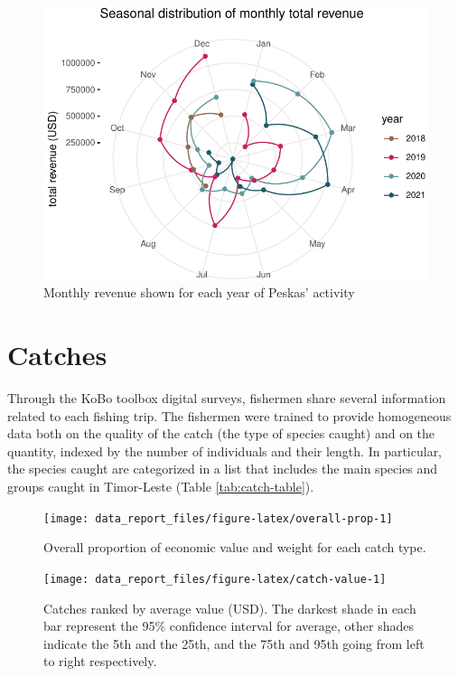 \documentclass[
]{article}
\begin{document}
\begin{figure}
\includegraphics[width=0.9\linewidth,height=0.7\textheight]{data_report_files/figure-latex/unnamed-chunk-3-1} \caption{Monthly revenue shown for each year of Peskas' activity}\label{fig:unnamed-chunk-3}
\end{figure}
\pagebreak

\hypertarget{catches}{%
\section{Catches}\label{catches}}

Through the KoBo toolbox digital surveys, fishermen share several information related to each fishing trip. The fishermen were trained to provide homogeneous data both on the quality of the catch (the type of species caught) and on the quantity, indexed by the number of individuals and their length. In particular, the species caught are categorized in a list that includes the main species and groups caught in Timor-Leste (Table \ref{tab:catch-table}).
\newline



\begin{figure}
\texttt{[image: data\_report\_files/figure-latex/overall-prop-1]} \caption{Overall proportion of economic value and weight for each catch type.}\label{fig:overall-prop}
\end{figure}



\begin{figure}
\texttt{[image: data\_report\_files/figure-latex/catch-value-1]} \caption{Catches ranked by average value (USD). The darkest shade in each bar represent the 95\% confidence interval for average, other shades indicate the 5th and the 25th, and the 75th and 95th going from left to right respectively.}\label{fig:catch-value}
\end{figure}
\end{document}
